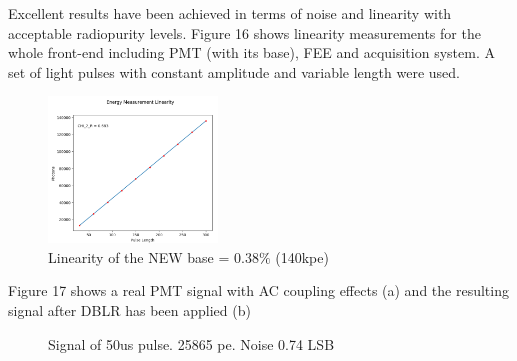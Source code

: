 \documentclass[a4paper, 10pt, oneside, twocolumn, 3p]{elsarticle}
\begin{document}
\par Excellent results have been achieved in terms of noise and linearity with acceptable radiopurity levels. Figure 16 shows linearity measurements for the whole front-end including PMT (with its base), FEE and acquisition system. A set of light pulses with constant amplitude and variable length were used.  

\begin{figure}[H]
	\begin{center}
		\includegraphics[width=0.4\textwidth]{./figures/7C_lin}
		\caption{Linearity of the NEW base = $0.38\%$ (140kpe)}
		\label{fig:linearity}
	\end{center}
\end{figure}

\par Figure 17 shows a real PMT signal with AC coupling effects (a) and the resulting signal after DBLR has been applied (b) 

\begin{figure}
	\centering
	\hfill
	\caption{Signal of 50us pulse. 25865 pe. Noise 0.74 LSB}
	\label{fig:graph_sig}
\end{figure} 
\end{document}
